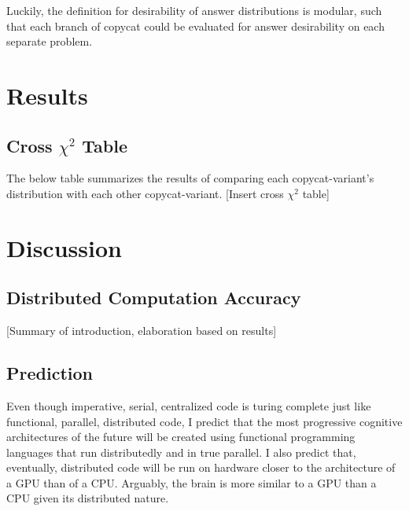 \documentclass[a4paper]{article}
\begin{document}
        Luckily, the definition for desirability of answer distributions is modular, such that each branch of copycat could be evaluated for answer desirability on each separate problem.
       
\section{Results}
    \subsection{Cross $\chi^2$ Table}
        The below table summarizes the results of comparing each copycat-variant's distribution with each other copycat-variant.
        [Insert cross $\chi^2$ table]
\section{Discussion}
    \subsection{Distributed Computation Accuracy}
        [Summary of introduction, elaboration based on results]
    \subsection{Prediction}
        Even though imperative, serial, centralized code is turing complete just like functional, parallel, distributed code, I predict that the most progressive cognitive architectures of the future will be created using functional programming languages that run distributedly and in true parallel. 
        I also predict that, eventually, distributed code will be run on hardware closer to the architecture of a GPU than of a CPU.
        Arguably, the brain is more similar to a GPU than a CPU given its distributed nature.



\end{document}
